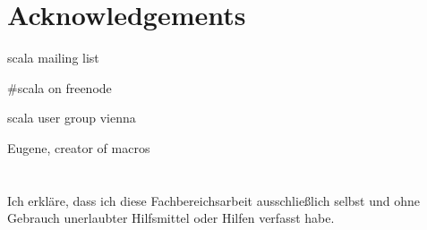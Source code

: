 \documentclass[12pt,oneside,a4paper]{scrbook}
\theoremstyle{definition}
\begin{document}
\chapter{Acknowledgements}
scala mailing list

\#scala on freenode

scala user group vienna

Eugene, creator of macros


\singlespacing

{}

\chapter*{}
\onehalfspacing
Ich erkläre, dass ich diese Fachbereichsarbeit ausschließlich selbst und ohne Gebrauch unerlaubter Hilfsmittel oder Hilfen verfasst habe.
\end{document}
